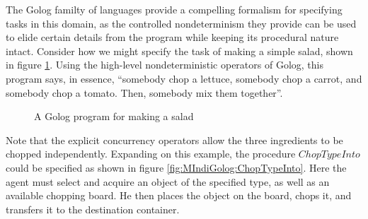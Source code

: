 The Golog familty of languages provide a compelling formalism for
specifying tasks in this domain, as the controlled nondeterminism
they provide can be used to elide certain details from the program
while keeping its procedural nature intact. Consider how we might
specify the task of making a simple salad, shown in figure \ref{fig:MIndiGolog:MakeSalad}.
Using the high-level nondeterministic operators of Golog, this program
says, in essence, {}``somebody chop a lettuce, somebody chop a carrot,
and somebody chop a tomato. Then, somebody mix them together''.

%
\begin{figure}
\begin{centering}
\par\end{centering}

\caption{A Golog program for making a salad\label{fig:MIndiGolog:MakeSalad}}

\end{figure}


Note that the explicit concurrency operators allow the three ingredients
to be chopped independently. Expanding on this example, the procedure
$ChopTypeInto$ could be specified as shown in figure \ref{fig:MIndiGolog:ChopTypeInto}.
Here the agent must select and acquire an object of the specified
type, as well as an available chopping board. He then places the object
on the board, chops it, and transfers it to the destination container.

